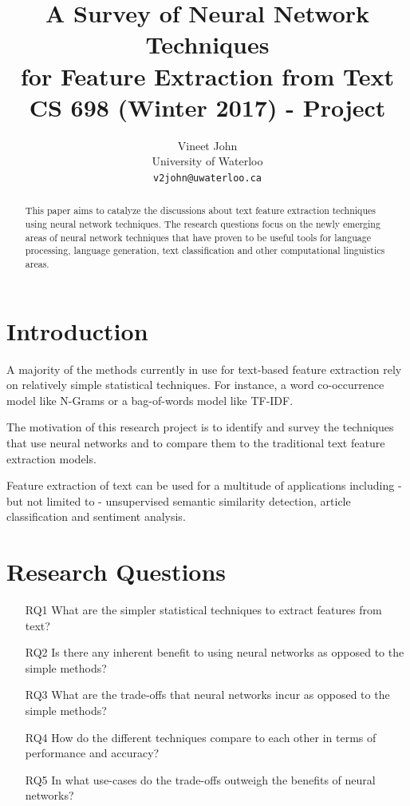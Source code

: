 \documentclass[11pt,a4paper]{article}
\title{A Survey of Neural Network Techniques\\ for Feature Extraction from Text\\ \large CS 698 (Winter 2017) - Project}
\author{
  Vineet John \\
  University of Waterloo \\
  {\tt v2john@uwaterloo.ca} \\
}
\date{}
\begin{document}
\maketitle


\begin{abstract}
  This paper aims to catalyze the discussions about text feature extraction techniques using neural network techniques. The research questions focus on the newly emerging areas of neural network techniques that have proven to be useful tools for language processing, language generation, text classification and other computational linguistics areas.
\end{abstract}


\section{Introduction} %
\label{sec:introduction}

  A majority of the methods currently in use for text-based feature extraction rely on relatively simple statistical techniques. For instance, a word co-occurrence model like N-Grams or a bag-of-words model like TF-IDF.

  The motivation of this research project is to identify and survey the techniques that use neural networks and to compare them to the traditional text feature extraction models.

  Feature extraction of text can be used for a multitude of applications including - but not limited to - unsupervised semantic similarity detection, article classification and sentiment analysis.


\section{Research Questions} %
\label{sec:research_questions}

  \begin{itemize}
    \item [RQ1] 
    What are the simpler statistical techniques to extract features from text?
    \item [RQ2] 
    Is there any inherent benefit to using neural networks as opposed to the simple methods?
    \item [RQ3] 
    What are the trade-offs that neural networks incur as opposed to the simple methods?
    \item [RQ4] 
    How do the different techniques compare to each other in terms of performance and accuracy?
    \item [RQ5] 
    In what use-cases do the trade-offs outweigh the benefits of neural networks?
  \end{itemize}
\end{document}
